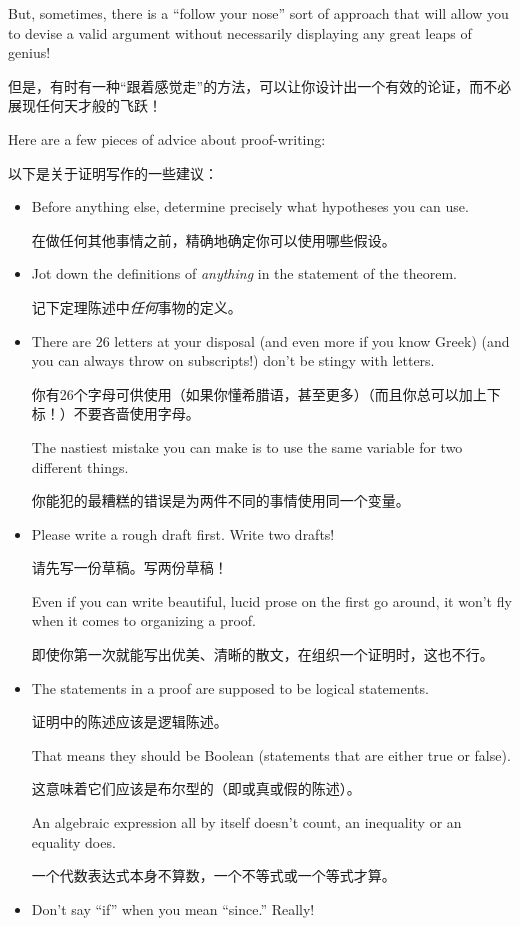 But, sometimes, 
there is a ``follow your nose'' sort of approach that will
allow you to devise a valid argument without necessarily displaying
any great leaps of genius!

但是，有时有一种“跟着感觉走”的方法，可以让你设计出一个有效的论证，而不必展现任何天才般的飞跃！

Here are a few pieces
of advice about proof-writing:

以下是关于证明写作的一些建议：

\begin{itemize}
\item Before anything else, determine precisely what hypotheses you
can use.

在做任何其他事情之前，精确地确定你可以使用哪些假设。
\item Jot down the definitions of {\em anything} in the statement of 
the theorem.

记下定理陈述中{\em 任何}事物的定义。
\item There are 26 letters at your disposal (and even more if you know
Greek) (and you can always throw on subscripts!) don't be stingy with
letters.

你有26个字母可供使用（如果你懂希腊语，甚至更多）（而且你总可以加上下标！）不要吝啬使用字母。

The nastiest mistake you can make is to use the same variable
for two different things.

你能犯的最糟糕的错误是为两件不同的事情使用同一个变量。
\item Please write a rough draft first.  Write two drafts!

请先写一份草稿。写两份草稿！

Even if you
can write beautiful, lucid prose on the first go around, it won't fly
when it comes to organizing a proof.

即使你第一次就能写出优美、清晰的散文，在组织一个证明时，这也不行。
\item The statements in a proof are supposed to be logical statements.

证明中的陈述应该是逻辑陈述。

That means they should be Boolean (statements that are either true or false).

这意味着它们应该是布尔型的（即或真或假的陈述）。

An algebraic expression all by itself doesn't count, an inequality or an 
equality does.

一个代数表达式本身不算数，一个不等式或一个等式才算。
\item Don't say ``if'' when you mean ``since.''  Really!


\end{itemize}
